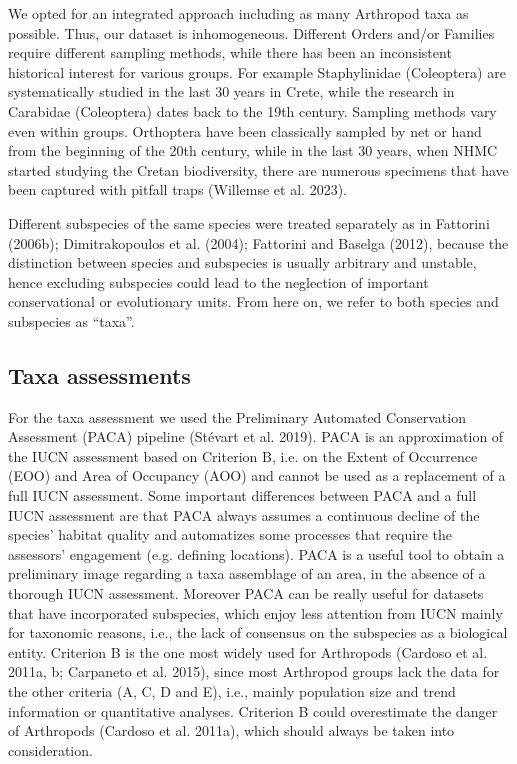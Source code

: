 We opted for an integrated approach including as many Arthropod taxa as
possible. Thus, our dataset is inhomogeneous. Different Orders and/or Families
require different sampling methods, while there has been an inconsistent
historical interest for various groups. For example Staphylinidae (Coleoptera)
are systematically studied in the last 30 years in Crete, while the research in
Carabidae (Coleoptera) dates back to the 19th century. Sampling methods vary
even within groups. Orthoptera have been classically sampled by net or hand
from the beginning of the 20th century, while in the last 30 years, when NHMC
started studying the Cretan biodiversity, there are numerous specimens that
have been captured with pitfall traps (Willemse et al. 2023).

Different subspecies of the same species were treated separately as in Fattorini (2006b); Dimitrakopoulos et al. (2004); Fattorini and Baselga (2012),
because the distinction between species and subspecies is usually arbitrary and
unstable, hence excluding subspecies could lead to the neglection of important
conservational or evolutionary units. From here on, we refer to both species
and subspecies as “taxa”.
    

    \subsection{Taxa assessments}
    \label{subsec:arthropods-taxa-assessments}
For the taxa assessment we used the Preliminary Automated Conservation Assessment
(PACA) pipeline (Stévart et al. 2019). PACA is an approximation of the IUCN
assessment based on Criterion B, i.e. on the Extent of Occurrence (EOO) and
Area of Occupancy (AOO) and cannot be used as a replacement of a full IUCN
assessment. Some important differences between PACA and a full IUCN assessment
are that PACA always assumes a continuous decline of the species’ habitat
quality and automatizes some processes that require the assessors' engagement
(e.g. defining locations). PACA is a useful tool to obtain a preliminary image
regarding a taxa assemblage of an area, in the absence of a thorough IUCN assessment.
Moreover PACA can be really useful for datasets that have incorporated subspecies,
which enjoy less attention from IUCN mainly for taxonomic reasons, i.e., the
lack of consensus on the subspecies as a biological entity. Criterion B is the
one most widely used for Arthropods (Cardoso et al. 2011a, b; Carpaneto et al. 2015),
since most Arthropod groups lack the data for the other criteria (A, C, D and E),
i.e., mainly population size and trend information or quantitative analyses.
Criterion B could overestimate the danger of Arthropods (Cardoso et al. 2011a),
which should always be taken into consideration.

